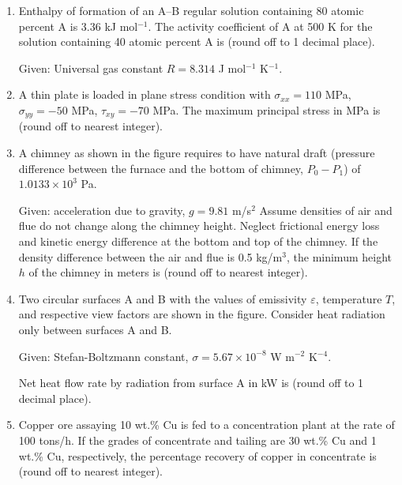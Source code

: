 \documentclass[12pt]{article}
\begin{document}
\begin{enumerate}
\item Enthalpy of formation of an A–B regular solution containing 80 atomic percent A is 3.36 kJ mol\(^{-1}\). The activity coefficient of A at 500 K for the solution containing 40 atomic percent A is \underline{\hspace{2cm}} (round off to 1 decimal place).  

Given: Universal gas constant \(R=8.314\) J mol\(^{-1}\) K\(^{-1}\).

\item A thin plate is loaded in plane stress condition with \(\sigma_{xx} = 110\) MPa, \(\sigma_{yy} = -50\) MPa, \(\tau_{xy} = -70\) MPa. The maximum principal stress in MPa is \underline{\hspace{2cm}} (round off to nearest integer).

\item A chimney as shown in the figure requires to have natural draft (pressure difference between the furnace and the bottom of chimney, \(P_0 - P_1\)) of \(1.0133 \times 10^3\) Pa.  

Given: acceleration due to gravity, \(g=9.81\) m/s\(^2\)  
Assume densities of air and flue do not change along the chimney height. Neglect frictional energy loss and kinetic energy difference at the bottom and top of the chimney.  
If the density difference between the air and flue is 0.5 kg/m\(^3\), the minimum height \(h\) of the chimney in meters is \underline{\hspace{2cm}} (round off to nearest integer).

\item Two circular surfaces A and B with the values of emissivity \(\varepsilon\), temperature \(T\), and respective view factors are shown in the figure. Consider heat radiation only between surfaces A and B.

Given: Stefan-Boltzmann constant, \(\sigma=5.67 \times 10^{-8}\) W m\(^{-2}\) K\(^{-4}\).

Net heat flow rate by radiation from surface A in kW is \underline{\hspace{2cm}} (round off to 1 decimal place).

\item Copper ore assaying 10 wt.\% Cu is fed to a concentration plant at the rate of 100 tons/h. If the grades of concentrate and tailing are 30 wt.\% Cu and 1 wt.\% Cu, respectively, the percentage recovery of copper in concentrate is \underline{\hspace{2cm}} (round off to nearest integer).


\end{enumerate}
\end{document}
